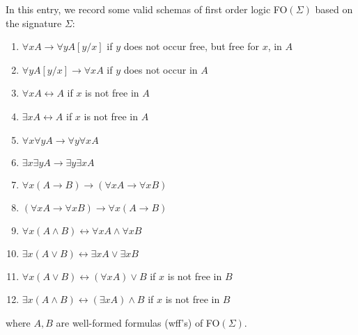 \documentclass[12pt]{article}
\begin{document}
In this entry, we record some valid schemas of first order logic FO$(\Sigma)$ based on the signature $\Sigma$:
\begin{enumerate}
\item $\forall x A \to \forall y A[y/x]$ if $y$ does not occur free, but free for $x$, in $A$
\item $\forall y A[y/x] \to \forall x A$ if $y$ does not occur in $A$
\item $\forall x A \leftrightarrow A$ if $x$ is not free in $A$
\item $\exists x A \leftrightarrow A$ if $x$ is not free in $A$
\item $\forall x \forall y A \to \forall y \forall x A$
\item $\exists x \exists y A \to \exists y \exists x A$
\item $\forall x (A\to B) \to (\forall x A \to \forall x B)$
\item $(\forall x A \to \forall x B) \to \forall x (A\to B)$
\item $\forall x (A\land B) \leftrightarrow \forall x A \land \forall x B$
\item $\exists x (A\lor B) \leftrightarrow \exists x A \lor \exists x B$
\item $\forall x (A \lor B) \leftrightarrow (\forall x A) \lor B$ if $x$ is not free in $B$
\item $\exists x (A\land B) \leftrightarrow (\exists x A) \land B$ if $x$ is not free in $B$
\end{enumerate}
where $A,B$ are well-formed formulas (wff's) of FO$(\Sigma)$.

\end{document}
